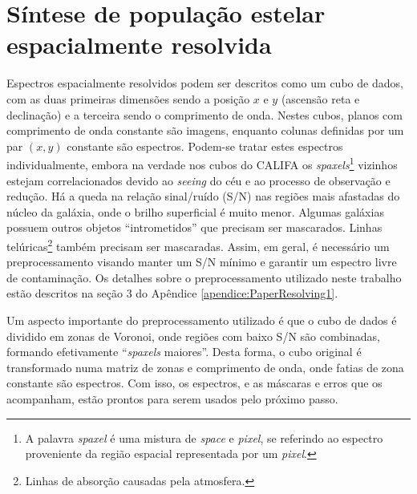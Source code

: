

\section{Síntese de população estelar espacialmente resolvida}
\label{sec:Intro:Sintese}


Espectros espacialmente resolvidos podem ser descritos como um cubo de dados,
com as duas primeiras dimensões sendo a posição $x$ e $y$ (ascensão reta e
declinação) e a terceira sendo o comprimento de onda. Nestes cubos, planos com
comprimento de onda constante são imagens, enquanto colunas definidas por um par
$(x, y)$ constante são espectros. Podem-se tratar estes espectros
individualmente, embora na verdade nos cubos do CALIFA os {\em
spaxels}\footnote{A palavra {\em spaxel} é uma mistura de {\em space} e {\em
pixel}, se referindo ao espectro proveniente da região espacial representada por
um {\em pixel}.} vizinhos estejam correlacionados devido ao {\em seeing} do céu
e ao processo de observação e redução. Há a queda na relação sinal/ruído (S/N)
nas regiões mais afastadas do núcleo da galáxia, onde o brilho superficial é
muito menor.
Algumas galáxias possuem outros objetos ``intrometidos'' que precisam ser
mascarados. Linhas telúricas\footnote{Linhas de absorção causadas pela
atmosfera.} também precisam ser mascaradas. Assim, em geral, é necessário um
preprocessamento visando manter um S/N mínimo e garantir um espectro livre de
contaminação. Os detalhes sobre o preprocessamento utilizado neste trabalho
estão descritos na seção 3 do Apêndice \ref{apendice:PaperResolving1}.


Um aspecto importante do preprocessamento utilizado é que o cubo de dados é
dividido em zonas de Voronoi, onde regiões com baixo S/N são combinadas,
formando efetivamente ``{\em spaxels} maiores''. Desta forma, o cubo original é
transformado numa matriz de zonas e comprimento de onda, onde fatias de zona
constante são espectros. Com isso, os espectros, e as máscaras e erros que os
acompanham, estão prontos para serem usados pelo próximo passo.

